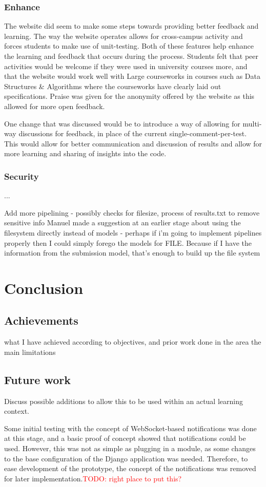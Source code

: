 \documentclass[a4paper,11pt]{report}
\newcommand{\todo}[1]{\textcolor{red}{TODO: #1}}
\begin{document}
\subsection{Enhance}
The website did seem to make some steps towards providing better feedback and learning. The way the website operates allows for cross-campus activity and forces students to make use of unit-testing. Both of these features help enhance the learning and feedback that occurs during the process. Students felt that peer activities would be welcome if they were used in university courses more, and that the website would work well with Large courseworks in courses such as Data Structures \& Algorithms where the courseworks have clearly laid out specifications. Praise was given for the anonymity offered by the website as this allowed for more open feedback.\par
One change that was discussed would be to introduce a way of allowing for multi-way discussions for feedback, in place of the current single-comment-per-test. This would allow for better communication and discussion of results and allow for more learning and sharing of insights into the code.
\subsection{Security}
...

Add more pipelining - possibly checks for filesize, process of results.txt to remove sensitive info Manuel made a suggestion at an earlier stage about using the filesystem directly instead of models - perhaps if i'm going to implement pipelines properly then I could simply forego the models for FILE. Because if I have the information from the submission model, that's enough to build up the file system\par


\chapter{Conclusion}
\section{Achievements}
what I have achieved according to objectives, and prior work done in the area
the main limitations
\section{Future work}
Discuss possible additions to allow this to be used within an actual learning context.\par
Some initial testing with the concept of WebSocket-based notifications was done at this stage, and a basic proof of concept showed that notifications could be used. However, this was not as simple as plugging in a module, as some changes to the base configuration of the Django application was needed. Therefore, to ease development of the prototype, the concept of the notifications was removed for later implementation.\todo{right place to put this?}\par
\end{document}
